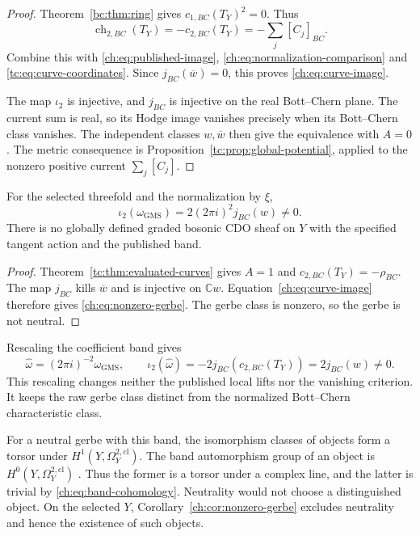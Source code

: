 \begin{proof}
Theorem~\ref{bc:thm:ring} gives $c_{1,BC}(T_Y)^2=0$.
Thus
\[
        \operatorname{ch}_{2,BC}(T_Y)
                           =-c_{2,BC}(T_Y)
                           =-\sum_j[C_j]_{BC}.
\]
Combine this with \eqref{ch:eq:published-image},
\eqref{ch:eq:normalization-comparison} and
\eqref{tc:eq:curve-coordinates}.
Since $j_{BC}(\overline w)=0$, this proves
\eqref{ch:eq:curve-image}.

The map $\iota_2$ is injective, and $j_{BC}$ is injective
on the real Bott--Chern plane.
The current sum is real, so its Hodge image vanishes precisely
when its Bott--Chern class vanishes.
The independent classes $w,\overline w$ then give the equivalence
with $A=0$.
The metric consequence is
Proposition~\ref{tc:prop:global-potential}, applied to the
nonzero positive current $\sum_j[C_j]$.
\end{proof}

\begin{corollary}\label{ch:cor:nonzero-gerbe}
For the selected threefold and the normalization by $\xi$,
\begin{equation}\label{ch:eq:nonzero-gerbe}
 \iota_2(\omega_{\mathrm{GMS}})
              =2(2\pi i)^2j_{BC}(w)\ne0.
\end{equation}
There is no globally defined graded bosonic CDO sheaf on $Y$
with the specified tangent action and the published band.
\end{corollary}

\begin{proof}
Theorem~\ref{tc:thm:evaluated-curves} gives $A=1$ and
$c_{2,BC}(T_Y)=-\rho_{BC}$.
The map $j_{BC}$ kills $\overline w$ and is injective on
$\mathbb Cw$. Equation~\eqref{ch:eq:curve-image} therefore
gives \eqref{ch:eq:nonzero-gerbe}.
The gerbe class is nonzero, so the gerbe is not neutral.
\end{proof}

Rescaling the coefficient band gives
\[
 \widehat\omega=(2\pi i)^{-2}\omega_{\mathrm{GMS}},\qquad
 \iota_2(\widehat\omega)=-2j_{BC}(c_{2,BC}(T_Y))
                                      =2j_{BC}(w)\ne0.
\]
This rescaling changes neither the published local lifts nor the
vanishing criterion.
It keeps the raw gerbe class distinct from the normalized
Bott--Chern characteristic class.

For a neutral gerbe with this band, the isomorphism classes of
objects form a torsor under $H^1(Y,\Omega_Y^{2,\mathrm{cl}})$.
The band automorphism group of an object is
$H^0(Y,\Omega_Y^{2,\mathrm{cl}})$
\cite[Section~3]{GMSGerbes}.
Thus the former is a torsor under a complex line, and the latter
is trivial by \eqref{ch:eq:band-cohomology}.
Neutrality would not choose a distinguished object.
On the selected $Y$, Corollary~\ref{ch:cor:nonzero-gerbe}
excludes neutrality and hence the existence of such objects.


